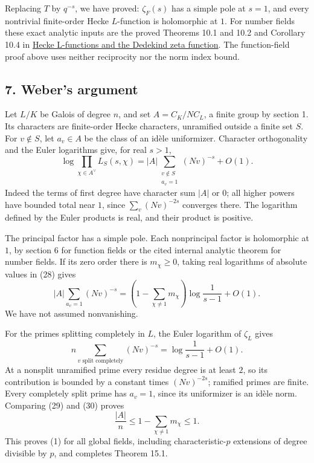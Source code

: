 \documentclass[11pt,a4paper]{article}
\begin{document}
Replacing \(T\) by \(q^{-s}\), we have proved: \(\zeta_F(s)\) has a
simple pole at \(s=1\), and every nontrivial finite-order Hecke
\(L\)-function is holomorphic at \(1\). For number fields these exact
analytic inputs are the proved Theorems 10.1 and 10.2 and Corollary 10.4
in
\href{https://kokunoyumeto.github.io/open-math-courses/courses/NT-CFT/proof-dependencies.html\#NT-ADL-10}{Hecke
L-functions and the Dedekind zeta function}. The function-field proof
above uses neither reciprocity nor the norm index bound.

\subsection{7. Weber's argument}\label{webers-argument}

Let \(L/K\) be Galois of degree \(n\), and set \(A=C_K/NC_L\), a finite
group by section 1. Its characters are finite-order Hecke characters,
unramified outside a finite set \(S\). For \(v\notin S\), let
\(a_v\in A\) be the class of an idèle uniformizer. Character
orthogonality and the Euler logarithms give, for real \(s>1\), \[
\log\prod_{\chi\in A^\vee}L_S(s,\chi)
=|A|\sum_{\substack{v\notin S\\a_v=1}}(Nv)^{-s}+O(1).
\tag{28}
\] Indeed the terms of first degree have character sum \(|A|\) or \(0\);
all higher powers have bounded total near \(1\), since
\(\sum_v(Nv)^{-2s}\) converges there. The logarithm defined by the Euler
products is real, and their product is positive.

The principal factor has a simple pole. Each nonprincipal factor is
holomorphic at \(1\), by section 6 for function fields or the cited
internal analytic theorem for number fields. If its zero order there is
\(m_\chi\geq0\), taking real logarithms of absolute values in (28) gives
\[
|A|\sum_{a_v=1}(Nv)^{-s}
=\left(1-\sum_{\chi\ne1}m_\chi\right)
\log\frac1{s-1}+O(1).
\tag{29}
\] We have not assumed nonvanishing.

For the primes splitting completely in \(L\), the Euler logarithm of
\(\zeta_L\) gives \[
n\sum_{v\text{ split completely}}(Nv)^{-s}
=\log\frac1{s-1}+O(1).
\tag{30}
\] At a nonsplit unramified prime every residue degree is at least
\(2\), so its contribution is bounded by a constant times
\((Nv)^{-2s}\); ramified primes are finite. Every completely split prime
has \(a_v=1\), since its uniformizer is an idèle norm. Comparing (29)
and (30) proves \[
\frac{|A|}{n}\leq1-\sum_{\chi\ne1}m_\chi\leq1.
\] This proves (1) for all global fields, including characteristic-\(p\)
extensions of degree divisible by \(p\), and completes Theorem 15.1.
\end{document}
